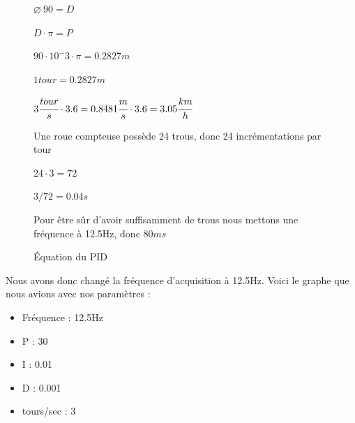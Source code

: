 \documentclass[
	a4paper,									%
	11pt,										%
	twoside,									%
	openright,									%
	notitlepage,									%
	parskip=half,								%
]{scrreprt}										%
\begin{document}
\begin{figure}[h]
    $\varnothing\ 90 = D$ \par
    $D \cdot \pi = P$ \par
    $90 \cdot 10^-3 \cdot \pi = 0.2827m$ \par
    $1 tour = 0.2827m$ \par
    $3 \cfrac{tour}{s} \cdot 3.6 = 0.8481\cfrac{m}{s} \cdot 3.6 = 3.05\cfrac{km}{h}$ \par
    Une roue compteuse possède 24 trous, donc 24 incrémentations par tour \par
    $24 \cdot 3 = 72$ \par
    $3 / 72 = 0.04s$ \par
    Pour être sûr d'avoir suffisamment de trous nous mettons une fréquence à 12.5Hz, donc $80ms$
    \caption{Équation du PID}
    \label{eq1}
\end{figure}

Nous avons donc changé la fréquence d'acquisition à 12.5Hz. Voici le graphe que nous avions avec nos paramètres : 

\begin{center}
    

    
    
    \begin{itemize}
        \item Fréquence : 12.5Hz
        \item P : 30
        \item I : 0.01
        \item D : 0.001
        \item tours/sec : 3
    \end{itemize}
    \end{center}
\end{document}
